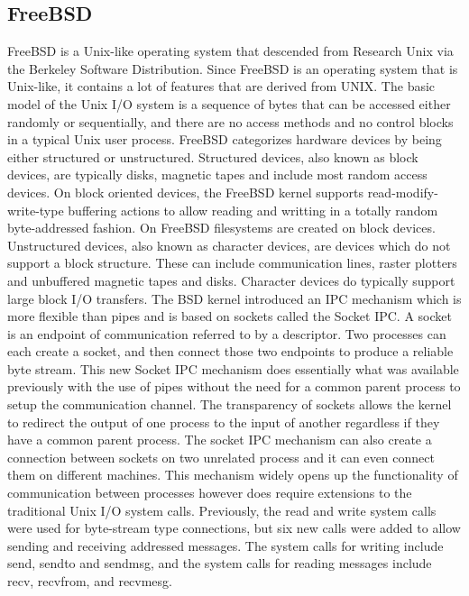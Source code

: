 \documentclass[10pt,draftclsnofoot,onecolumn,journal,compsoc]{IEEEtran}
\begin{document}
\subsection*{FreeBSD}
FreeBSD is a Unix-like operating system that descended from Research Unix via the Berkeley Software Distribution.
        Since FreeBSD is an operating system that is Unix-like, it contains a lot of features that are derived from UNIX.
        The basic model of the Unix I/O system is a sequence of bytes that can be accessed either randomly or sequentially, and there are no access methods and no control blocks in a typical Unix user process.
        FreeBSD categorizes hardware devices by being either structured or unstructured.
        Structured devices, also known as block devices, are typically disks, magnetic tapes and include most random access devices.
        On block oriented devices, the FreeBSD kernel supports read-modify-write-type buffering actions to allow reading and writting in a totally random byte-addressed fashion.
        On FreeBSD filesystems are created on block devices.
        Unstructured devices, also known as character devices, are devices which do not support a block structure.
        These can include communication lines, raster plotters and unbuffered magnetic tapes and disks.
        Character devices do typically support large block I/O transfers.
        The BSD kernel introduced an IPC mechanism which is more flexible than pipes and is based on sockets called the Socket IPC.
        A socket is an endpoint of communication referred to by a descriptor.
Two processes can each create a socket, and then connect those two endpoints to produce a reliable byte stream.
        This new Socket IPC mechanism does essentially what was available previously with the use of pipes without the need for a common parent process to setup the communication channel.
        The transparency of sockets allows the kernel to redirect the output of one process to the input of another regardless if they have a common parent process.
        The socket IPC mechanism can also create a connection between sockets on two unrelated process and it can even connect them on different machines.
        This mechanism widely opens up the functionality of communication between processes however does require extensions to the traditional Unix I/O system calls.
        Previously, the read and write system calls were used for byte-stream type connections, but six new calls were added to allow sending and receiving addressed messages.
        The system calls for writing include send, sendto and sendmsg, and the system calls for reading messages include recv, recvfrom, and recvmesg.
\end{document}
